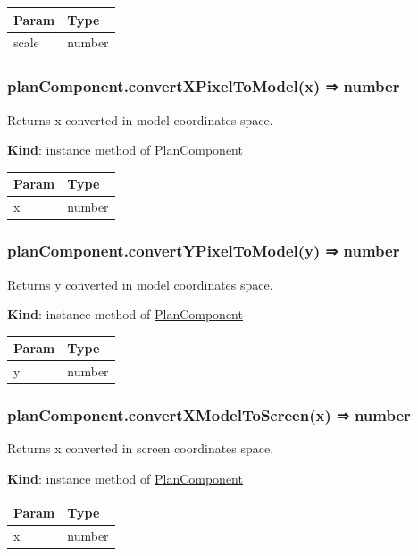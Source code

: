 \documentclass[a4paper]{report}
\begin{document}
\begin{longtable}[]{@{}ll@{}}
\toprule
Param & Type\tabularnewline
\midrule
\endhead
scale & number\tabularnewline
\bottomrule
\end{longtable}

\hypertarget{plancomponent.convertxpixeltomodelx-number}{%
\subsubsection{planComponent.convertXPixelToModel(x) ⇒
number}\label{plancomponent.convertxpixeltomodelx-number}}

Returns x converted in model coordinates space.

\textbf{Kind}: instance method of
\protect\hyperlink{PlanComponent}{PlanComponent}

\begin{longtable}[]{@{}ll@{}}
\toprule
Param & Type\tabularnewline
\midrule
\endhead
x & number\tabularnewline
\bottomrule
\end{longtable}

\hypertarget{plancomponent.convertypixeltomodely-number}{%
\subsubsection{planComponent.convertYPixelToModel(y) ⇒
number}\label{plancomponent.convertypixeltomodely-number}}

Returns y converted in model coordinates space.

\textbf{Kind}: instance method of
\protect\hyperlink{PlanComponent}{PlanComponent}

\begin{longtable}[]{@{}ll@{}}
\toprule
Param & Type\tabularnewline
\midrule
\endhead
y & number\tabularnewline
\bottomrule
\end{longtable}

\hypertarget{plancomponent.convertxmodeltoscreenx-number}{%
\subsubsection{planComponent.convertXModelToScreen(x) ⇒
number}\label{plancomponent.convertxmodeltoscreenx-number}}

Returns x converted in screen coordinates space.

\textbf{Kind}: instance method of
\protect\hyperlink{PlanComponent}{PlanComponent}

\begin{longtable}[]{@{}ll@{}}
\toprule
Param & Type\tabularnewline
\midrule
\endhead
x & number\tabularnewline
\bottomrule
\end{longtable}
\end{document}
